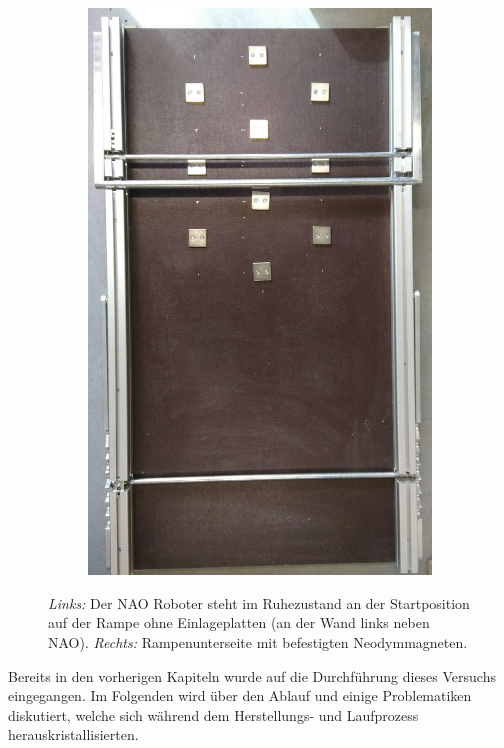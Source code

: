 \begin{figure}[htb]
\begin{subfigure}[c]{0.4\linewidth}
	\end{subfigure}
	\hfill
	\begin{subfigure}[c]{0.4315\linewidth}
		\centering
		\includegraphics[width=\linewidth]{Bilder/magneten_an_rampe1_geschnitten.jpg}
	\end{subfigure}
	\hfill
	\caption{\textit{Links:} Der NAO Roboter steht im Ruhezustand an der Startposition auf der Rampe ohne Einlageplatten (an der Wand links neben NAO). \textit{Rechts:} Rampenunterseite mit befestigten Neodymmagneten.}
	\label{nao_und_rampe}
\end{figure}

Bereits in den vorherigen Kapiteln wurde auf die Durchführung dieses Versuchs eingegangen. Im Folgenden wird über den Ablauf und einige Problematiken diskutiert, welche sich während dem Herstellungs- und Laufprozess herauskristallisierten. 

